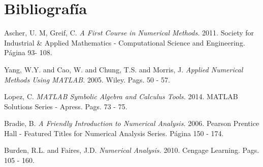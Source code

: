 \documentclass[11pt, spanish]{article}
\begin{document}
\section{Bibliografía}

\begingroup
\renewcommand{\section}[2]{}%
\begin{thebibliography}{}

 Ascher, U. M, Greif, C. {\em A First Course in Numerical Methods.}  2011. Society for Industrial \& Applied Mathematics - Computational Science and Engineering. Página 93- 108.

 Yang, W.Y. and Cao, W. and Chung, T.S. and Morris, J. {\em Applied Numerical Methods Using MATLAB.} 2005. Wiley. Pags. 50 - 57.

 Lopez, C. {\em MATLAB Symbolic Algebra and Calculus Tools.} 2014. MATLAB Solutions Series - Apress. Pags. 73 - 75.

  Bradie, B. {\em A Friendly Introduction to Numerical Analysis.}  2006. Pearson Prentice Hall - Featured Titles for Numerical Analysis Series. Página 150 - 174.

 Burden, R.L. and Faires, J.D. {\em Numerical Analysis.} 2010. Cengage Learning. Pags. 105 - 160.

\end{thebibliography}
\endgroup


\end{document}

